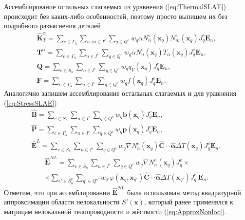 Ассемблирование остальных слагаемых из уравнения (\ref{eq:ThermalSLAE}) происходит без каких-либо особенностей, поэтому просто выпишем их без подробного разъяснения деталей
\begin{gather}
	\label{eq:HeatTransferMatrix}
	\widehat{\textbf{K}}^{\alpha}_T =
	\sum\limits_{e \in \Gamma_h}
	\sum\limits_{n,m \in I^{e}}
	\sum\limits_{q \in Q^e}
	w_q \alpha N_n^e (\boldsymbol{x}_q) N_m^e (\boldsymbol{x}_q) J_q^e \boldsymbol{E}_n,
	\\
	\label{eq:HeatTransferVector}
	\textbf{T}^{\alpha} =
	\sum\limits_{e \in \Gamma_h}
	\sum\limits_{n \in I^{e}}
	\sum\limits_{q \in Q^e}
	w_q \alpha N_n^e (\boldsymbol{x}_q) T_{\alpha} (\boldsymbol{x}_q) J_q^e \boldsymbol{E}_n,
	\\
	\label{eq:InnerFlux}
	\textbf{Q} =
	\sum\limits_{e \in S_h}
	\sum\limits_{n \in I^e}
	\sum\limits_{q \in Q^e}
	w_q q_V (\boldsymbol{x}_q) J_q^e \boldsymbol{E}_n,
	\\
	\label{eq:OuterFlux}
	\textbf{F} =
	\sum\limits_{e \in \Gamma_h}
	\sum\limits_{n \in I^e}
	\sum\limits_{q \in Q^e}
	w_q f (\boldsymbol{x}_q) J_q^e \boldsymbol{E}_n.
\end{gather}
Аналогично запишем ассемблирование остальных слагаемых и для уравнения (\ref{eq:StressSLAE})
\begin{gather}
	\label{eq:InnerPressure}
	\widehat{\textbf{B}} =
	\sum\limits_{e \in S_h}
	\sum\limits_{n \in I^e}
	\sum\limits_{q \in Q^e}
	w_q \boldsymbol{b} (\boldsymbol{x}_q) J_q^e \boldsymbol{E}_n,
	\\
	\label{eq:OuterPressure}
	\widehat{\textbf{P}} = 
	\sum\limits_{e \in \Gamma_h}
	\sum\limits_{n \in I^e}
	\sum\limits_{q \in Q^e}
	w_q \boldsymbol{p} (\boldsymbol{x}_q) J_q^e \boldsymbol{E}_n,
	\\
	\label{eq:LocalThermalExpansion}
	\widehat{\textbf{E}}^L = 
	\sum\limits_{e \in S_h}
	\sum\limits_{n \in I^e}
	\sum\limits_{q \in Q^e}
	w_q \nabla N_n^e (\boldsymbol{x}_q) \widehat{\mathbf{C}} \cdot \cdot \widehat{\boldsymbol{\alpha}} \Delta T (\boldsymbol{x}_q) J_q^e \boldsymbol{E}_n,
\end{gather}
\begin{multline}
	\label{eq:NonLocalThermalExpansion}
	\widehat{\textbf{E}}^{NL} = 
	\sum\limits_{e \in S_h}
	\sum\limits_{n \in I^e}
	\sum\limits_{q \in Q^e}
	w_q \nabla N_n^e (\boldsymbol{x}_q) J_q^e 
	\times \\ \times
	\sum\limits_{e' \in S_h^q}
	\sum\limits_{q' \in Q^{e'}}
	w_{q'} \varphi (\boldsymbol{x}_q, \boldsymbol{x}_{q'}) \widehat{\mathbf{C}} \cdot \cdot \widehat{\boldsymbol{\alpha}} \Delta T (\boldsymbol{x}_{q'}) J_{q'}^{e'} \boldsymbol{E}_n.
\end{multline}
Отметим, что при ассемблировании $\widehat{\textbf{E}}^{NL}$ была использован метод квадратурной аппроксимации области нелокальности $S'(\boldsymbol{x})$, который ранее применялся к матрицам нелокальной телопроводности и жёсткости (\ref{eq:ApproxNonloc}).

